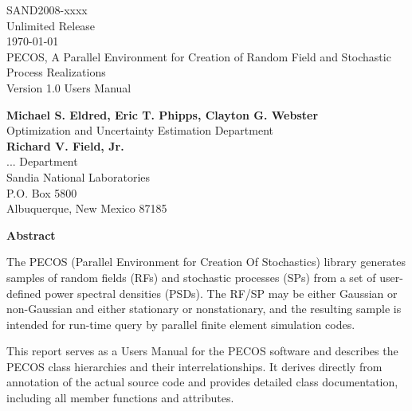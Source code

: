 \documentclass[letterpaper]{book}
\begin{document}
\begin{titlepage}
\setcounter{page}{3}
\begin{center}
{\large SAND2008-xxxx}\\
{\large Unlimited Release}\\
{\large \today}\\

\vspace*{1.5cm}
{\LARGE PECOS, A Parallel Environment for Creation of Random Field and
Stochastic Process Realizations}\\
\vspace*{1cm}
{\LARGE Version 1.0 Users Manual}\\
\vspace*{1cm}

{\large \bf Michael S. Eldred, Eric T. Phipps, Clayton G. Webster}\\
{\large Optimization and Uncertainty Estimation Department}\\
\vspace*{0.5cm}
{\large \bf Richard V. Field, Jr.}\\
{\large ... Department}\\
\vspace*{0.5cm}
{\large Sandia National Laboratories}\\
{\large P.O. Box 5800}\\
{\large Albuquerque, New Mexico 87185}\\
\vspace*{1cm}

{\Large \bf Abstract}
\end{center}

The PECOS (Parallel Environment for Creation Of Stochastics) library
generates samples of random fields (RFs) and stochastic processes
(SPs) from a set of user-defined power spectral densities (PSDs).  The
RF/SP may be either Gaussian or non-Gaussian and either stationary or
nonstationary, and the resulting sample is intended for run-time query
by parallel finite element simulation codes.

This report serves as a Users Manual for the PECOS software and
describes the PECOS class hierarchies and their interrelationships.
It derives directly from annotation of the actual source code and
provides detailed class documentation, including all member functions
and attributes.

\end{titlepage}
\end{document}
